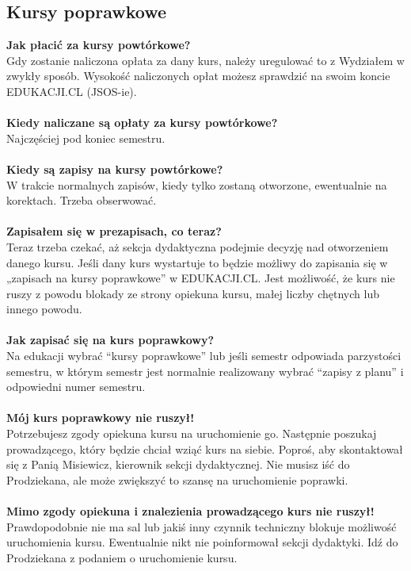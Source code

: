 \documentclass[11pt]{article}
\begin{document}
\subsection{Kursy poprawkowe}
\textbf{Jak płacić za kursy powtórkowe?} \\
\indent Gdy zostanie naliczona opłata za dany kurs, należy uregulować to z Wydziałem w zwykły sposób. Wysokość naliczonych opłat możesz sprawdzić na swoim koncie EDUKACJI.CL (JSOS-ie). \\\\
\textbf{Kiedy naliczane są opłaty za kursy powtórkowe?} \\
\indent Najczęściej pod koniec semestru. \\\\
\textbf{Kiedy są zapisy na kursy powtórkowe?} \\
\indent W trakcie normalnych zapisów, kiedy tylko zostaną otworzone, ewentualnie na korektach. Trzeba obserwować. \\\\
\textbf{Zapisałem się w prezapisach, co teraz?} \\
\indent Teraz trzeba czekać, aż sekcja dydaktyczna podejmie decyzję nad otworzeniem danego kursu. Jeśli dany kurs wystartuje to będzie możliwy do zapisania się w „zapisach na kursy poprawkowe” w EDUKACJI.CL. Jest możliwość, że kurs nie ruszy z powodu blokady ze strony opiekuna kursu, małej liczby chętnych lub innego powodu. \\\\
\textbf{Jak zapisać się na kurs poprawkowy?} \\
\indent Na edukacji wybrać “kursy poprawkowe” lub jeśli semestr odpowiada parzystości semestru, w którym semestr jest normalnie realizowany wybrać “zapisy z planu” i odpowiedni numer semestru. \\\\
\textbf{Mój kurs poprawkowy nie ruszył!} \\
\indent Potrzebujesz zgody opiekuna kursu na uruchomienie go. Następnie poszukaj prowadzącego, który będzie chciał wziąć kurs na siebie. Poproś, aby skontaktował się z Panią Misiewicz, kierownik sekcji dydaktycznej. Nie musisz iść do Prodziekana, ale może zwiększyć to szansę na uruchomienie poprawki. \\\\
\textbf{Mimo zgody opiekuna i znalezienia prowadzącego kurs nie ruszył!} \\
\indent Prawdopodobnie nie ma sal lub jakiś inny czynnik techniczny blokuje możliwość uruchomienia kursu. Ewentualnie nikt nie poinformował sekcji dydaktyki. Idź do Prodziekana z podaniem o uruchomienie kursu. \\\\
\end{document}
